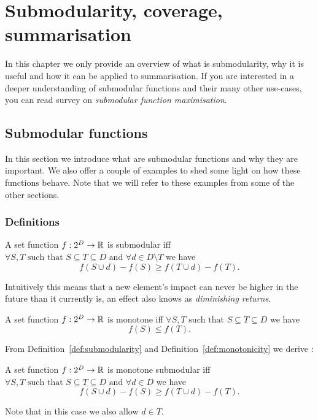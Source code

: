 \chapter{Submodularity, coverage, summarisation}

In this chapter we only provide an overview of what is submodularity, why it is
useful and how it can be applied to summarisation. If you are interested in a
deeper understanding of submodular functions and their many other use-cases,
you can read survey \cite{krause2012submodular} on \emph{submodular function
maximisation}.

\section{Submodular functions}

In this section we introduce what are submodular functions and why they are
important. We also offer a couple of examples to shed some light on how these
functions behave. Note that we will refer to these examples from some of the
other sections.

\subsection{Definitions}

\begin{definition}[Submodularity]
  \label{def:submodularity}
  A set function \(f : 2^D \to \mathbb{R}\) is submodular iff
  \(\forall S, T \text{ such that } S \subseteq T \subseteq D
    \text{ and } \forall d \in D \setminus T\) we have
  \[f(S \cup {d}) - f(S) \geq f(T \cup {d}) - f(T).\]
\end{definition}
Intuitively this means that a new element's impact can never be higher in the
future than it currently is, an effect also knows as \emph{diminishing returns}.

\begin{definition}[Monotonicity]
  \label{def:monotonicity}
  A set function \(f : 2^D \to \mathbb{R}\) is monotone iff
  \(\forall S, T \text{ such that } S \subseteq T \subseteq D\) we have
  \[f(S) \leq f(T).\]
\end{definition}

From Definition~\vref{def:submodularity} and Definition~\vref{def:monotonicity}
we derive \cite{nemhauser1978analysis}:
\begin{proposition}
  \label{def:mono-submod}
  A set function \(f : 2^D \to \mathbb{R}\) is monotone submodular iff
  \(\forall S, T \text{ such that } S \subseteq T \subseteq D
    \text{ and } \forall d \in D\) we have
  \[f(S \cup {d}) - f(S) \geq f(T \cup {d}) - f(T).\]
\end{proposition}
Note that in this case we also allow \(d \in T\).

